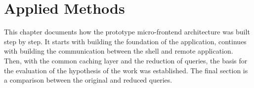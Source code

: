 \chapter{Applied Methods}\label{chapter:applied-methods}

This chapter documents how the prototype micro-frontend architecture was built step by step. It starts with building the foundation of the application, continues with building the communication between the shell and remote application. Then, with the common caching layer and the reduction of queries, the basis for the evaluation of the hypothesis of the work was established. The final section is a comparison between the original and reduced queries.








